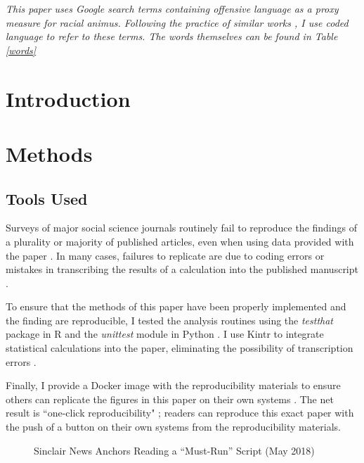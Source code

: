 \documentclass{article}
\begin{document}
\title{}
\maketitle{}
\textit{This paper uses Google search terms containing offensive language as a proxy measure for racial animus. Following the practice of similar works \parencites{Stephens_Davidowitz_2014}{Chae_2015}{Chae_2018}{Isoya_2021}, I use coded language to refer to these terms. The words themselves can be found in Table \ref{words}}

\section{Introduction}

\section{Methods}

\subsection{Tools Used}

Surveys of major social science journals routinely fail to reproduce the findings of a plurality or majority of published articles, even when using data provided with the paper \parencites[][]{Nuijten_2015}{Nuijten_2020}{Eubank_2016}.
In many cases, failures to replicate are due to coding errors or mistakes in transcribing the results of a calculation into the published manuscript \parencite[][]{Eubank_2016}.

To ensure that the methods of this paper have been properly implemented and the finding are reproducible, I tested the analysis routines using the \textit{testthat} package in R \parencite[][]{testthat} and the \textit{unittest} module in Python \parencite[][]{Python}.
I use Kintr to integrate statistical calculations into the paper, eliminating the possibility of transcription errors \parencite[][]{knitr}.

Finally, I provide a Docker image \parencite[][]{docker} with the reproducibility materials to ensure others can replicate the figures in this paper on their own systems \parencite{Boettiger_2015}.
The net result is ``one-click reproducibility" \parencite[][]{N_st_2020}; readers can reproduce this exact paper with the push of a button on their own systems from the reproducibility materials.


\begin{figure}
\caption{Sinclair News Anchors Reading a ``Must-Run'' Script (May 2018)}

\end{figure}
\end{document}
